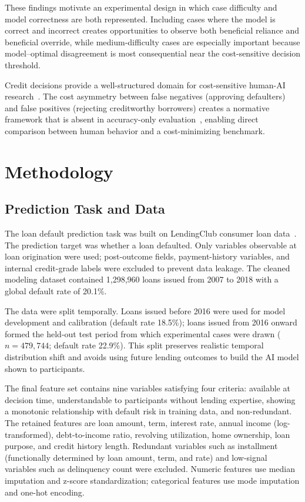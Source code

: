 \documentclass[conference]{IEEEtran}
\begin{document}
These findings motivate an experimental design in which case difficulty
and model correctness are both represented. Including cases where the
model is correct and incorrect creates opportunities to observe both
beneficial reliance and beneficial override, while medium-difficulty
cases are especially important because model--optimal disagreement is
most consequential near the cost-sensitive decision threshold.

Credit decisions provide a well-structured domain for cost-sensitive
human-AI research~\cite{thomas2009consumer}. The cost asymmetry between
false negatives (approving defaulters) and false positives (rejecting
creditworthy borrowers) creates a normative framework that is absent in
accuracy-only evaluation~\cite{elkan2001foundations}, enabling direct
comparison between human behavior and a cost-minimizing benchmark.

\section{Methodology}
\label{sec:method}

\subsection{Prediction Task and Data}

The loan default prediction task was built on LendingClub consumer loan
data~\cite{lendingclub2018}. The prediction target was whether a loan defaulted. Only variables
observable at loan origination were used; post-outcome fields,
payment-history variables, and internal credit-grade labels were excluded
to prevent data leakage. The cleaned modeling dataset contained
1,298,960 loans issued from 2007 to 2018 with a global default rate of
20.1\%.

The data were split temporally. Loans issued before 2016 were used for
model development and calibration (default rate 18.5\%); loans issued
from 2016 onward formed the held-out test period from which experimental
cases were drawn ($n = 479{,}744$; default rate 22.9\%). This split
preserves realistic temporal distribution shift and avoids using future
lending outcomes to build the AI model shown to participants.

The final feature set contains nine variables satisfying four criteria:
available at decision time, understandable to participants without lending expertise, showing a monotonic relationship with default risk in training data, and non-redundant. The retained features are loan amount, term, interest rate, annual income (log-transformed), debt-to-income ratio, revolving
utilization, home ownership, loan purpose, and credit history length.
Redundant variables such as installment (functionally determined by loan
amount, term, and rate) and low-signal variables such as delinquency
count were excluded. Numeric features use median imputation and
z-score standardization; categorical features use mode imputation and
one-hot encoding.
\end{document}
